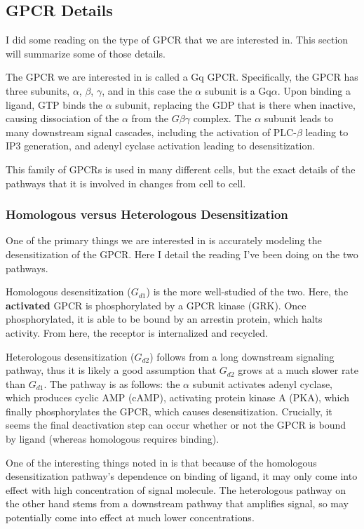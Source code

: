 \documentclass[12pt]{article}
\begin{document}
\subsection{GPCR Details}

I did some reading on the type of GPCR that we are interested in. This section will summarize some of those details.

The GPCR we are interested in is called a Gq GPCR. Specifically, the GPCR has three subunits, $\alpha$, $\beta$, $\gamma$, and in this case the $\alpha$ subunit is a Gq$\alpha$. Upon binding a ligand, GTP binds the $\alpha$ subunit, replacing the GDP that is there when inactive, causing dissociation of the $\alpha$ from the $G\beta\gamma$ complex. The $\alpha$ subunit leads to many downstream signal cascades, including the activation of PLC-$\beta$ leading to IP3 generation, and adenyl cyclase activation leading to desensitization. 

This family of GPCRs is used in many different cells, but the exact details of the pathways that it is involved in changes from cell to cell.

\subsubsection{Homologous versus Heterologous Desensitization}

One of the primary things we are interested in is accurately modeling the desensitization of the GPCR. Here I detail the reading I've been doing on the two pathways.

Homologous desensitization ($G_{d1}$) is the more well-studied of the two. Here, the \textbf{activated} GPCR is phosphorylated by a GPCR kinase (GRK). Once phosphorylated, it is able to be bound by an arrestin protein, which halts activity. From here, the receptor is internalized and recycled. \cite{hilger2018structure}

Heterologous desensitization ($G_{d2}$) follows from a long downstream signaling pathway, thus it is likely a good assumption that $G_{d2}$ grows at a much slower rate than $G_{d1}$. The pathway is as follows:  the $\alpha$ subunit activates adenyl cyclase, which produces cyclic AMP (cAMP), activating protein kinase A (PKA), which finally phosphorylates the GPCR, which causes desensitization. Crucially, it seems the final deactivation step can occur whether or not the GPCR is bound by ligand (whereas homologous requires binding). \cite{kelly2008agonist}

One of the interesting things noted in \cite{kelly2008agonist} is that because of the homologous desensitization pathway's dependence on binding of ligand, it may only come into effect with high concentration of signal molecule. The heterologous pathway on the other hand stems from a downstream pathway that amplifies signal, so may potentially come into effect at much lower concentrations.
\end{document}
